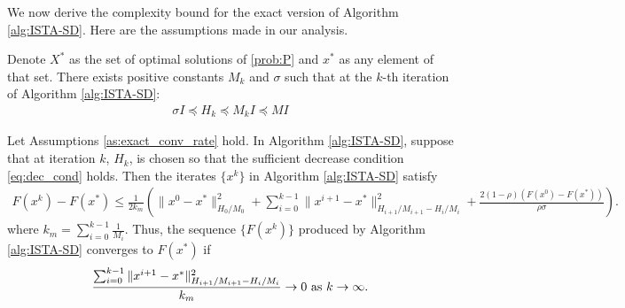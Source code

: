 \documentclass[11pt]{article}
\numberwithin{equation}{section}
\begin{document}
We now derive the complexity bound for  the exact version of Algorithm \ref{alg:ISTA-SD}. Here are the assumptions made in our analysis.
\begin{assumption}\leavevmode %
\label{as:exact_conv_rate}
	\assume
	\label{assub:optimal_exist}
	Denote $X^*$ as the set of optimal solutions of \eqref{prob:P} and $x^*$ as any element of that set.
	\assume 
	\label{assub:bound_h}
	There exists positive constants $M_k$ and $\sigma$ such that at the $k$-th iteration of Algorithm \ref{alg:ISTA-SD}: 
	\begin{align*}
	     \sigma I \preceq H_k \preceq M_kI \preceq MI
	\end{align*} 
\end{assumption}


 

\begin{theorem}\label{the:ISTA-SD}
Let Assumptions \ref{as:exact_conv_rate} hold. In Algorithm \ref{alg:ISTA-SD}, suppose that at iteration $k$,  $H_k$, is chosen so that the sufficient decrease condition \eqref{eq:dec_cond} holds.
Then the iterates $\{x^k\}$ in Algorithm \ref{alg:ISTA-SD} satisfy
\begin{align}
    \label{the:ISTA-nonsmooth-conclude} 
    F(x^k) - F(x^*) \leq \frac{1}{2k_m}  \left( \|x^0-x^*\|_{H_0/M_0}^2 + \sum_{i=0}^{k-1}\|x^{i+1} - x^*\|_{H_{i+1}/M_{i+1}-H_i/M_i}^2 + \frac{2(1-\rho)(F(x^0)-F(x^*))}{\rho\sigma}\right).
\end{align}
where $k_m = \sum_{i=0}^{k-1} \frac{1}{M_i}$. Thus, the sequence $\{F(x^k)\}$ produced by Algorithm \ref{alg:ISTA-SD} converges to $F(x^*)$ if  
\[
\frac{\sum_{i=0}^{k-1}\|x^{i+1} - x^*\|_{H_{i+1}/M_{i+1}-H_i/M_i}^2}{k_m} \to 0\ {\rm as\ } k\to \infty.
\]
\end{theorem}
\end{document}
